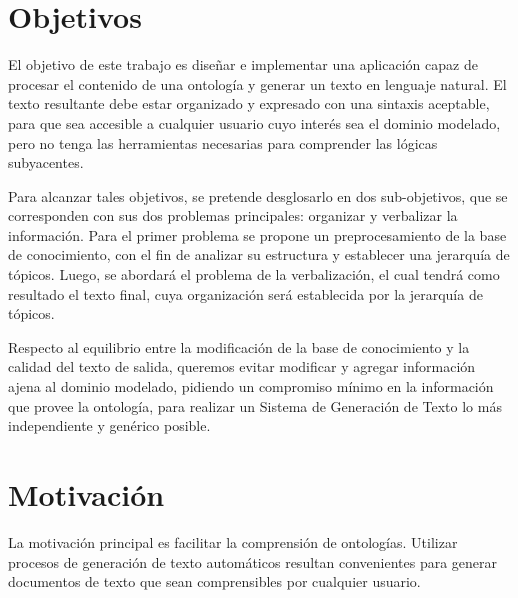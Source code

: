 \documentclass[11pt,a4paper,spanish]{book}
\begin{document}
\section{Objetivos}\label{Intro:objetivo}
El objetivo de este trabajo es diseñar e implementar una aplicación capaz de procesar el contenido de una ontología y generar un texto en lenguaje natural. El texto resultante debe estar organizado y  expresado con una sintaxis aceptable, para que sea accesible a cualquier usuario cuyo interés sea el dominio modelado, pero no tenga las herramientas necesarias para comprender las lógicas subyacentes.

Para alcanzar tales objetivos, se pretende desglosarlo en dos sub-objetivos, que se corresponden con sus dos problemas principales: organizar y verbalizar la información. Para el primer problema se propone un preprocesamiento de la base de conocimiento, con el fin de analizar su estructura y establecer una jerarquía de tópicos. Luego, se abordará el problema de la verbalización, el cual tendrá como resultado el texto final, cuya organización será establecida por la jerarquía de tópicos.

Respecto al equilibrio entre la modificación de la base de conocimiento y la calidad del texto de salida, queremos evitar modificar y agregar información ajena al dominio modelado, pidiendo un compromiso mínimo en la información que provee la ontología, para realizar un Sistema de Generación de Texto lo más independiente y genérico posible.

\section{Motivación}
La motivación principal es facilitar la comprensión de ontologías. Utilizar procesos de generación de texto automáticos resultan convenientes para generar documentos de texto que sean comprensibles por cualquier usuario.
\end{document}
